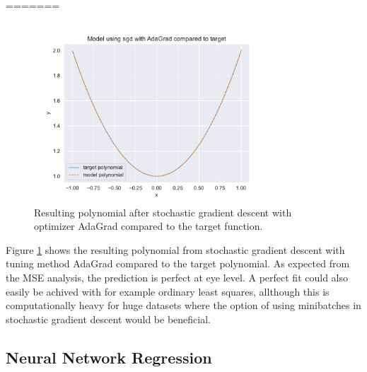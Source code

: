 =======

\begin{figure}[H]
\centering
\includegraphics[width=0.8\textwidth]{Figures/PartA/sgd_polynomial_fit}
\caption{Resulting polynomial after stochastic gradient descent with optimizer AdaGrad compared to the target function.}
\label{fig:sgd_polynomial_fit}
\end{figure}

Figure \ref{fig:sgd_polynomial_fit} shows the resulting polynomial from stochastic gradient descent with tuning method AdaGrad compared 
to the target polynomial. As expected from the MSE analysis, the prediction is perfect at eye level. A perfect fit could also easily be achived 
with for example ordinary least squares, allthough this is computationally heavy for huge datasets where the option of using minibatches in 
stochastic gradient descent would be beneficial. 

\subsection{Neural Network Regression}

